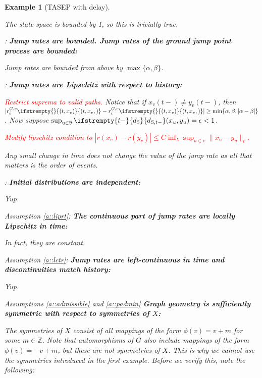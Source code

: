 \documentclass[12pt]{article}
\newcommand{\mb}{\mathbb}
\newcommand{\ov}{\overline}
\newcommand{\te}{\text}
\newcommand{\ep}{\epsilon}
\newcommand{\tr}{\textcolor{red}}
\newcommand{\cl}[1]{\ov{#1}}						%
\newcommand{\Xf}{X}									%
\newcommand{\rate}{r}								%
\newcommand{\stmet}[1]{
\ifstrempty{#1}{
	d_{\te{S}}}{
	d_{\te{S},#1}}}									%
\newcommand{\xf}{x}									%
\newcommand{\xg}{y}									%
\newcommand{\vind}[1]{_{#1}}						%
\newcommand{\tme}[1]{(#1)}							%
\newcommand{\stpara}[1]{_{#1}}						%
\newcommand{\gvpara}[2]{^{#1,#2}}					%
\newcommand{\tmepro}[3]{
\ifstrempty{#3}{
	\left(#1,#2\right)}{
	\left(#1,#2,#3\right)}}							%
\newtheorem{example}[thms]{Example}
\begin{document}
\begin{example}[TASEP with delay]
\begin{description}
The state space is bounded by 1, so this is trivially true.

\item[] \cite[Assumption \ref{F-a::bddr}]{F}: \textbf{Jump rates are bounded. Jump rates of the ground jump point process are bounded:}

Jump rates are bounded from above by \(\max\{\alpha,\beta\}\).

\item[] \cite[Assumption \ref{F-a::liprx}]{F}: \textbf{Jump rates are Lipschitz with respect to history:}

\tr{Restrict suprema to valid paths.} Notice that if \(\xf\vind{v}\tme{t-} \neq \xg\vind{v}\tme{t-}\), then \(|\rate\gvpara{G}{v}\stpara{i}\tmepro{t}{\xf\vind{v}}{} - \rate\gvpara{G}{v}\stpara{i}\tmepro{t}{\xf\vind{v}}{}| \geq \min\{\alpha,\beta,|\alpha-\beta|\}\). Now suppose \(\sup_{u\in\cl{v}} \stmet{t-}(\xf\vind{u},\xg\vind{u}) = \ep < 1\).

\tr{Modify lipschitz condition to \(|r(x_{\cl{v}}) - r(y_{\cl{v}})|\leq C\inf_{\lambda}\sup_{u\in\cl{v}}\|x_u - y_u\|_t\).}

Any small change in time does not change the value of the jump rate as all that matters is the order of events.

\item[] \cite[Assumption \ref{F-CI::indinit}]{F}: \textbf{Initial distributions are independent:}

Yup.

\item[] Assumption \ref{a::liprt}: \textbf{The continuous part of jump rates are locally Lipschitz in time:}

In fact, they are constant.

\item[] Assumption \ref{a::lctr}: \textbf{Jump rates are left-continuous in time and discontinuities match history:}

Yup.

\item[] Assumptions \ref{a::admissible} and \ref{a::padmin} \textbf{Graph geometry is sufficiently symmetric with respect to symmetries of \(\Xf\):}

The symmetries of \(\Xf\) consist of all mappings of the form \(\phi(v) = v + m\) for some \(m \in \mb{Z}\). Note that automorphisms of \(G\) also include mappings of the form \(\phi(v) = -v+m\), but these are not symmetries of \(\Xf\). This is why we cannot use the symmetries introduced in the first example. Before we verify this, note the following:


\end{description}
\end{example}
\end{document}
